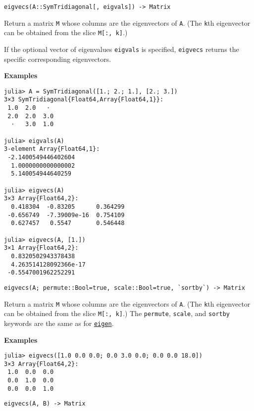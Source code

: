 \begin{adjustwidth}{2em}{0pt}


\begin{verbatim}
eigvecs(A::SymTridiagonal[, eigvals]) -> Matrix
\end{verbatim}

Return a matrix \texttt{M} whose columns are the eigenvectors of \texttt{A}. (The \texttt{k}th eigenvector can be obtained from the slice \texttt{M[:, k]}.)

If the optional vector of eigenvalues \texttt{eigvals} is specified, \texttt{eigvecs} returns the specific corresponding eigenvectors.

\textbf{Examples}


\begin{verbatim}
julia> A = SymTridiagonal([1.; 2.; 1.], [2.; 3.])
3×3 SymTridiagonal{Float64,Array{Float64,1}}:
 1.0  2.0   ⋅
 2.0  2.0  3.0
  ⋅   3.0  1.0

julia> eigvals(A)
3-element Array{Float64,1}:
 -2.1400549446402604
  1.0000000000000002
  5.140054944640259

julia> eigvecs(A)
3×3 Array{Float64,2}:
  0.418304  -0.83205      0.364299
 -0.656749  -7.39009e-16  0.754109
  0.627457   0.5547       0.546448

julia> eigvecs(A, [1.])
3×1 Array{Float64,2}:
  0.8320502943378438
  4.263514128092366e-17
 -0.5547001962252291
\end{verbatim}




\begin{lstlisting}
eigvecs(A; permute::Bool=true, scale::Bool=true, `sortby`) -> Matrix
\end{lstlisting}

Return a matrix \texttt{M} whose columns are the eigenvectors of \texttt{A}. (The \texttt{k}th eigenvector can be obtained from the slice \texttt{M[:, k]}.) The \texttt{permute}, \texttt{scale}, and \texttt{sortby} keywords are the same as for \hyperlink{11056016707394839114}{\texttt{eigen}}.

\textbf{Examples}


\begin{verbatim}
julia> eigvecs([1.0 0.0 0.0; 0.0 3.0 0.0; 0.0 0.0 18.0])
3×3 Array{Float64,2}:
 1.0  0.0  0.0
 0.0  1.0  0.0
 0.0  0.0  1.0
\end{verbatim}




\begin{lstlisting}
eigvecs(A, B) -> Matrix
\end{lstlisting}


\end{adjustwidth}
